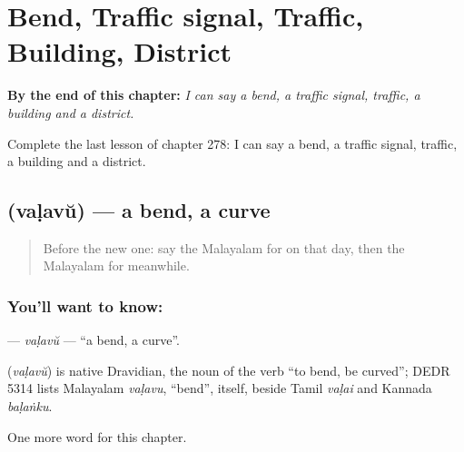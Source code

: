 
\chapter{Bend, Traffic signal, Traffic, Building, District}
\label{ch:ml-bend-traffic-signal-traffic-building-district}

\begin{chapteropening}
\textbf{By the end of this chapter:} \emph{I can say a bend, a traffic signal, traffic, a building and a district.}

Complete the last lesson of chapter 278: I can say a bend, a traffic signal, traffic, a building and a district.
\end{chapteropening}

\section[\texorpdfstring{\ml{വളവ്} (vaḷavŭ)}{വളവ് (vaḷavŭ)}]{ (vaḷavŭ) — a bend, a curve}

\label{lesson:ML-C278-valavu}



\begin{quote}
Before the new one: say the Malayalam for on that day, then the Malayalam for meanwhile.
\end{quote}

\subsection*{You'll want to know: }
\textbf{} — \emph{vaḷavŭ} — \textquotedblleft{}a bend, a curve\textquotedblright{}.

\begin{cousinweb}
\textbf{} (\emph{vaḷavŭ}) is native Dravidian, the noun of the verb \textquotedblleft{}to bend, be curved\textquotedblright{}; DEDR 5314 lists Malayalam \emph{vaḷavu}, \textquotedblleft{}bend\textquotedblright{}, itself, beside Tamil \emph{vaḷai} and Kannada \emph{baḷaṅku}.
\end{cousinweb}

\begin{grammarlens}[title={What you've built}]
One more word for this chapter.
\end{grammarlens}

